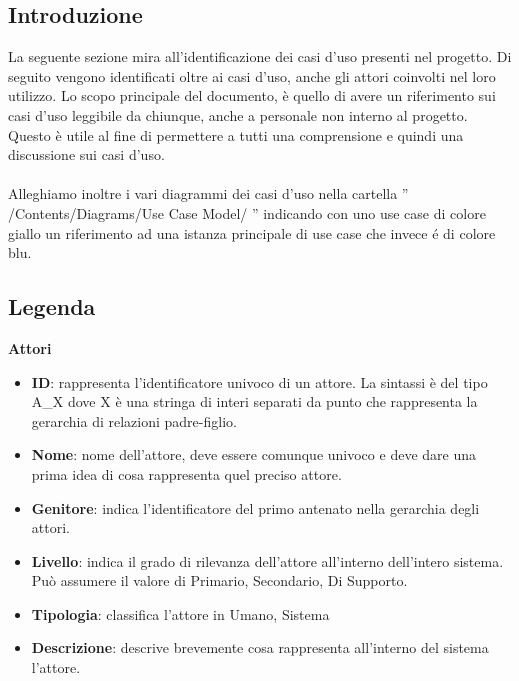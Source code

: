 \setlength{\arrayrulewidth}{.5mm}
\setlength{\tabcolsep}{5pt}
\renewcommand{\arraystretch}{2}
\renewcommand{\labelenumii}{\theenumii}
\renewcommand{\theenumii}{\theenumi.\arabic{enumii}.}

\newcommand{\lastUC}{\theucCounter}
\newcommand{\nextUC}{\stepcounter{ucCounter}{\theucCounter}}


\subsection{Introduzione}
La seguente sezione mira all'identificazione dei casi d'uso presenti nel progetto. Di seguito vengono identificati oltre ai casi d'uso, anche gli attori coinvolti nel loro utilizzo.
Lo scopo principale del documento, è quello di avere un riferimento sui casi d'uso leggibile da chiunque, anche a personale non interno al progetto. Questo è utile al fine di permettere a tutti una comprensione e quindi una discussione sui casi d'uso.\\\\
Alleghiamo inoltre i vari diagrammi dei casi d'uso nella cartella '' /Contents/Diagrams/Use Case Model/ '' indicando con uno use case di colore giallo un riferimento ad una istanza principale di use case che invece \'e di colore blu.

\subsection{Legenda}
\large{\textbf{Attori}} \\
\begin{itemize}[]
	\item \textbf{ID}: rappresenta l'identificatore univoco di un attore. La sintassi è del tipo A\_X dove X è una stringa di interi separati da punto che rappresenta la gerarchia di relazioni padre-figlio.
	\item \textbf{Nome}: nome dell'attore, deve essere comunque univoco e deve dare una prima idea di cosa rappresenta quel preciso attore.
	\item \textbf{Genitore}: indica l'identificatore del primo antenato nella gerarchia degli attori.
	\item \textbf{Livello}: indica il grado di rilevanza dell'attore all'interno dell'intero sistema. Può assumere il valore di {Primario, Secondario, Di Supporto}.
	\item \textbf{Tipologia}: classifica l'attore in {Umano, Sistema}
	\item \textbf{Descrizione}: descrive brevemente cosa rappresenta all'interno del sistema l'attore.\
\end{itemize}


